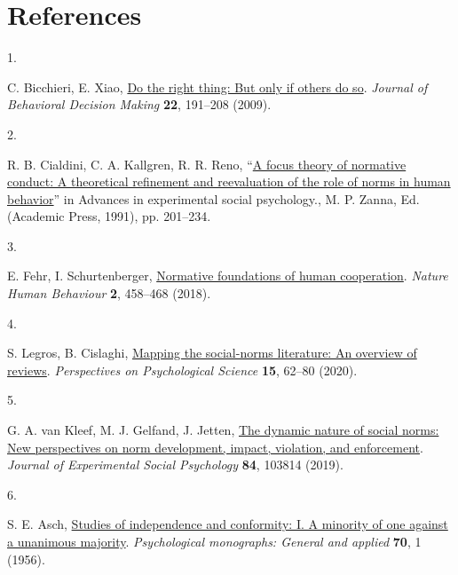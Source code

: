 \documentclass[
  man,floatsintext]{apa6}
\newlength{\cslhangindent}
\newlength{\csllabelwidth}
\newlength{\cslentryspacingunit} %
\newenvironment{CSLReferences}[2] %
 {%
  \setlength{\parindent}{0pt}
  \ifodd #1
  \let\oldpar\par
  \def\par{\hangindent=\cslhangindent\oldpar}
  \fi
  \setlength{\parskip}{#2\cslentryspacingunit}
 }%
 {}
\newcommand{\CSLLeftMargin}[1]{\parbox[t]{\csllabelwidth}{#1}}
\newcommand{\CSLRightInline}[1]{\parbox[t]{\linewidth - \csllabelwidth}{#1}\break}
\begin{document}
\newpage

\hypertarget{references}{%
\section{References}\label{references}}

\begingroup

\hypertarget{refs}{}
\begin{CSLReferences}{0}{0}
\leavevmode{}%
\CSLLeftMargin{1. }%
\CSLRightInline{C. Bicchieri, E. Xiao, \href{https://doi.org/10.1002/bdm.621}{Do the right thing: But only if others do so}. \emph{Journal of Behavioral Decision Making} \textbf{22}, 191--208 (2009).}

\leavevmode{}%
\CSLLeftMargin{2. }%
\CSLRightInline{R. B. Cialdini, C. A. Kallgren, R. R. Reno, {``\href{https://doi.org/10.1016/S0065-2601(08)60330-5}{A focus theory of normative conduct: A theoretical refinement and reevaluation of the role of norms in human behavior}''} in Advances in experimental social psychology., M. P. Zanna, Ed. (Academic Press, 1991), pp. 201--234.}

\leavevmode{}%
\CSLLeftMargin{3. }%
\CSLRightInline{E. Fehr, I. Schurtenberger, \href{https://doi.org/10.1038/s41562-018-0385-5}{Normative foundations of human cooperation}. \emph{Nature Human Behaviour} \textbf{2}, 458--468 (2018).}

\leavevmode{}%
\CSLLeftMargin{4. }%
\CSLRightInline{S. Legros, B. Cislaghi, \href{https://doi.org/10.1177/1745691619866455}{Mapping the social-norms literature: An overview of reviews}. \emph{Perspectives on Psychological Science} \textbf{15}, 62--80 (2020).}

\leavevmode{}%
\CSLLeftMargin{5. }%
\CSLRightInline{G. A. van Kleef, M. J. Gelfand, J. Jetten, \href{https://doi.org/10.1016/j.jesp.2019.05.002}{The dynamic nature of social norms: New perspectives on norm development, impact, violation, and enforcement}. \emph{Journal of Experimental Social Psychology} \textbf{84}, 103814 (2019).}

\leavevmode{}%
\CSLLeftMargin{6. }%
\CSLRightInline{S. E. Asch, \href{https://doi.org/10.1037/h0093718}{Studies of independence and conformity: I. A minority of one against a unanimous majority}. \emph{Psychological monographs: General and applied} \textbf{70}, 1 (1956).}


\end{CSLReferences}
\end{document}
